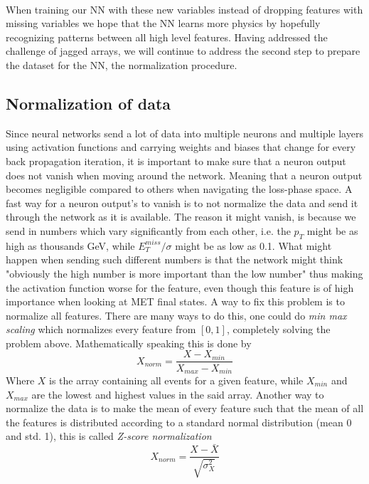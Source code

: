 \documentclass[12pt, a4paper]{book}
\begin{document}
\\When training our NN with these new variables instead of dropping features with missing variables we hope that the NN learns more physics by hopefully recognizing patterns between all high level features. Having addressed the challenge of jagged arrays, we will continue to 
address the second step to prepare the dataset for the NN, the normalization procedure. 

\subsection{Normalization of data}\label{sec:normie_NN}
Since neural networks send a lot of data into multiple neurons and multiple layers using activation functions and carrying weights and biases that change 
for every back propagation iteration, it is important to make sure that a neuron output does not vanish when moving around the network. Meaning that a neuron output becomes negligible compared to others when navigating the loss-phase space.
A fast way for a neuron output's to vanish is to not normalize the data and send it through the network as it is available. The reason it might vanish, is because we send in numbers which vary significantly from each other, i.e. the $p_{T}$ might be as high as thousands GeV, while 
$E_T^{miss}/\sigma$ might be as low as 0.1. What might happen when sending such different numbers is that the network might think "obviously the high number is more important than the low number" thus making the activation function worse for the feature, even though 
this feature is of high importance when looking at MET final states. A way to fix this problem is to normalize all features. There are many ways to do this, one could do \textit{min max scaling} which normalizes every feature from $[0,1]$, completely solving the problem above. 
Mathematically speaking this is done by
\begin{equation}\label{eq:minmax}
   X_{norm} = \frac{X - X_{min}}{X_{max}-X_{min}}
\end{equation}
Where $X$ is the array containing all events for a given feature, while $X_{min}$ and $X_{max}$ are the lowest and highest values in the said array. Another way to normalize the data is to make the mean of every feature such that the mean of all the features is distributed according 
to a standard normal distribution (mean 0 and std. 1), this is called \textit{Z-score normalization}
\begin{equation}\label{eq:Z-score}
   X_{norm} = \frac{X - \bar{X}}{\sqrt{\sigma_X^2}}
\end{equation}
\end{document}
